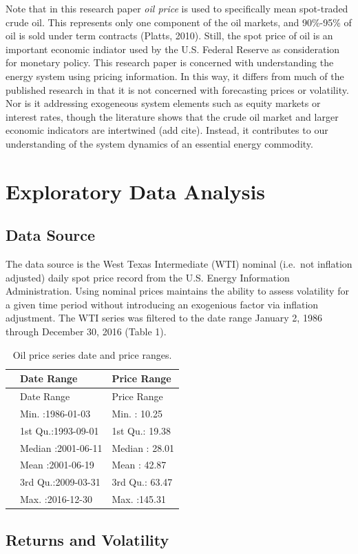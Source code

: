 \documentclass[]{article}
\begin{document}
Note that in this research paper \emph{oil price} is used to
specifically mean spot-traded crude oil. This represents only one
component of the oil markets, and 90\%-95\% of oil is sold under term
contracts (Platts, 2010). Still, the spot price of oil is an important
economic indiator used by the U.S. Federal Reserve as consideration for
monetary policy. This research paper is concerned with understanding the
energy system using pricing information. In this way, it differs from
much of the published research in that it is not concerned with
forecasting prices or volatility. Nor is it addressing exogeneous system
elements such as equity markets or interest rates, though the literature
shows that the crude oil market and larger economic indicators are
intertwined (add cite). Instead, it contributes to our understanding of
the system dynamics of an essential energy commodity.

\section{Exploratory Data Analysis}\label{exploratory-data-analysis}

\subsection{Data Source}\label{data-source}

The data source is the West Texas Intermediate (WTI) nominal (i.e.~not
inflation adjusted) daily spot price record from the U.S. Energy
Information Administration. Using nominal prices maintains the ability
to assess volatility for a given time period without introducing an
exogenious factor via inflation adjustment. The WTI series was filtered
to the date range January 2, 1986 through December 30, 2016 (Table 1).

\begin{longtable}[]{@{}lll@{}}
\caption{Oil price series date and price ranges.}\tabularnewline
\toprule
& Date Range & Price Range\tabularnewline
\midrule
\endfirsthead
\toprule
& Date Range & Price Range\tabularnewline
\midrule
\endhead
& Min. :1986-01-03 & Min. : 10.25\tabularnewline
& 1st Qu.:1993-09-01 & 1st Qu.: 19.38\tabularnewline
& Median :2001-06-11 & Median : 28.01\tabularnewline
& Mean :2001-06-19 & Mean : 42.87\tabularnewline
& 3rd Qu.:2009-03-31 & 3rd Qu.: 63.47\tabularnewline
& Max. :2016-12-30 & Max. :145.31\tabularnewline
\bottomrule
\end{longtable}

\subsection{Returns and Volatility}\label{returns-and-volatility}
\end{document}
